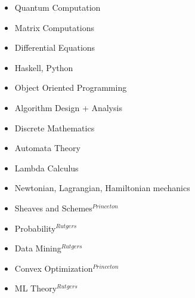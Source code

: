 \begin{multicols}{3}
\begin{itemize}
\setlength\itemsep{-0.5em}
\item Quantum Computation
\item Matrix Computations
\item Differential Equations
\item Haskell, Python
\item Object Oriented Programming
\item Algorithm Design + Analysis
\item Discrete Mathematics
\item Automata Theory
\item Lambda Calculus
\item Newtonian, Lagrangian, Hamiltonian mechanics
\item Sheaves and Schemes$^{Princeton}$
\item Probability$^{Rutgers}$
\item Data Mining$^{Rutgers}$
\item Convex Optimization$^{Princeton}$
\item ML Theory$^{Rutgers}$
\end{itemize}
\end{multicols}


\vspace{-5pt}



